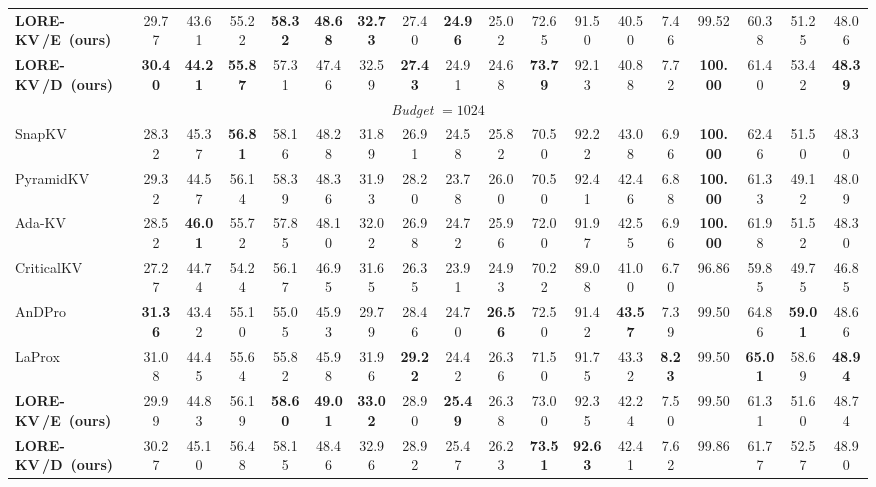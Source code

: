 \documentclass{article} %
\newcommand{\best}[1]{\textcolor{bestblue}{\textbf{#1}}}
\newcommand{\second}[1]{\textcolor{secondorange}{#1}}
\newcommand{\lorekvE}{LORE-KV\,/E}
\newcommand{\lorekvD}{LORE-KV\,/D}
\begin{document}
\begin{table}[t]
{\begin{tabular}{lccccccccccccccccc}
\textbf{\lorekvE\ (ours)}
& 29.77 & 43.61 & 55.22 & \best{58.32}
& \best{48.68} & \best{32.73} & \second{27.40}
& \best{24.96} & \second{25.02} & 72.65 & 91.50
& 40.50 & 7.46 & 99.52 & 60.38 & 51.25 & 48.06 \\

\textbf{\lorekvD\ (ours)}
& \best{30.40} & \best{44.21} & \best{55.87} & 57.31
& 47.46 & \second{32.59} & \best{27.43}
& \second{24.91} & 24.68 & \best{73.79} & 92.13
& 40.88 & \second{7.72} & \best{100.00}
& 61.40 & \second{53.42} & \best{48.39} \\


\midrule
\multicolumn{18}{c}{\textit{Budget} $=1024$} \\
\midrule
SnapKV
& 28.32 & \second{45.37} & \best{56.81} & 58.16
& 48.28 & 31.89 & 26.91 & 24.58 & 25.82 & 70.50
& 92.22 & 43.08 & 6.96 & \best{100.00}
& 62.46 & 51.50 & 48.30 \\

PyramidKV
& 29.32 & 44.57 & 56.14 & \second{58.39} & 48.36
& 31.93 & 28.20 & 23.78 & 26.00 & 70.50
& \second{92.41} & 42.46 & 6.88 & \best{100.00}
& 61.33 & 49.12 & 48.09 \\

Ada-KV
& 28.52 & \best{46.01} & 55.72 & 57.85 & 48.10
& 32.02 & 26.98 & 24.72 & 25.96 & 72.00
& 91.97 & 42.55 & 6.96 & \best{100.00}
& 61.98 & 51.52 & 48.30 \\

CriticalKV
& 27.27 & 44.74 & 54.24 & 56.17 & 46.95
& 31.65 & 26.35 & 23.91 & 24.93 & 70.22
& 89.08 & 41.00 & 6.70 & 96.86 & 59.85 & 49.75
& 46.85 \\

AnDPro
& \best{31.36} & 43.42 & 55.10 & 55.05 & 45.93
& 29.79 & 28.46 & 24.70 & \best{26.56} & 72.50
& 91.42 & \best{43.57} & 7.39 & 99.50
& \second{64.86} & \best{59.01} & 48.66 \\

LaProx
& \second{31.08} & 44.45 & 55.64 & 55.82 & 45.98
& 31.96 & \best{29.22} & 24.42 & 26.36 & 71.50
& 91.75 & \second{43.32} & \best{8.23} & 99.50
& \best{65.01} & \second{58.69} & \best{48.94} \\

\textbf{\lorekvE\ (ours)}
& 29.99 & 44.83 & 56.19 & \best{58.60}
& \best{49.01} & \best{33.02} & 28.90
& \best{25.49} & \second{26.38} & \second{73.00}
& 92.35 & 42.24 & 7.50 & 99.50
& 61.31 & 51.60 & 48.74 \\

\textbf{\lorekvD\ (ours)}
& 30.27 & 45.10 & \second{56.48} & 58.15
& \second{48.46} & \second{32.96} & \second{28.92}
& \second{25.47} & 26.23 & \best{73.51}
& \best{92.63} & 42.41 & \second{7.62}
& \second{99.86} & 61.77 & 52.57
& \second{48.90} \\

\bottomrule
\end{tabular}%
}
\end{table}
\end{document}
